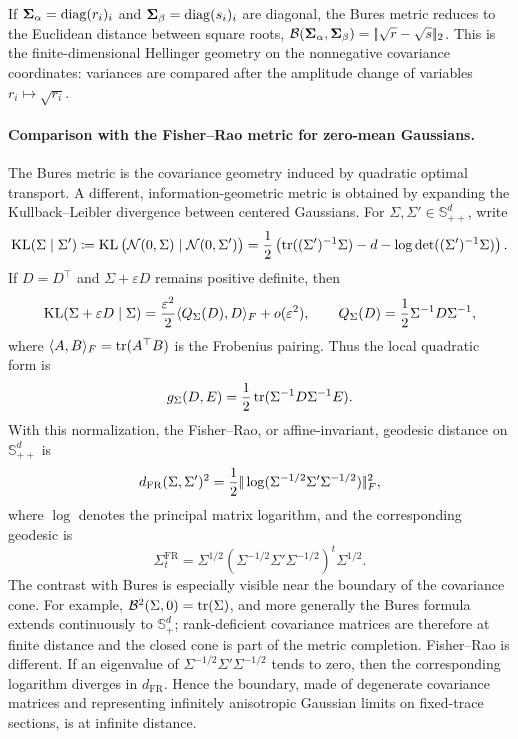 \begin{rem}
	If $\mathbf{\Sigma}_\alpha=\operatorname{diag}(r_i)_i$ and $\mathbf{\Sigma}_\beta=\operatorname{diag}(s_i)_i$ are diagonal, the Bures metric reduces to the Euclidean distance between square roots,
	$\mathcal{B}(\mathbf{\Sigma}_\alpha,\mathbf{\Sigma}_\beta)=|\!| \sqrt r-\sqrt s |\!|_2$.
	This is the finite-dimensional Hellinger geometry on the nonnegative covariance coordinates: variances are compared after the amplitude change of variables $r_i\mapsto\sqrt{r_i}$.
\end{rem}

\paragraph{Comparison with the Fisher--Rao metric for zero-mean Gaussians.}
The Bures metric is the covariance geometry induced by quadratic optimal transport. A different, information-geometric metric is obtained by expanding the Kullback--Leibler divergence between centered Gaussians. For $\Sigma,\Sigma'\in\mathbb S_{++}^d$, write
\[
	\operatorname{KL}(\Sigma\mid\Sigma')
	\coloneqq
	\operatorname{KL}\big(\mathcal{N}(0,\Sigma)\mid\mathcal{N}(0,\Sigma')\big)
	=
	\frac12\left(
	\operatorname{tr}((\Sigma')^{-1}\Sigma)-d-\log\det((\Sigma')^{-1}\Sigma)
	\right).
\]
If $D=D^\top$ and $\Sigma+\varepsilon D$ remains positive definite, then
\[
	\operatorname{KL}(\Sigma+\varepsilon D\mid\Sigma)
	=
	\frac{\varepsilon^2}{2}\langle Q_\Sigma(D),D\rangle_F+o(\varepsilon^2),
	\qquad
	Q_\Sigma(D)=\frac12\Sigma^{-1}D\Sigma^{-1},
\]
where $\langle A,B\rangle_F=\operatorname{tr}(A^\top B)$ is the Frobenius pairing. Thus the local quadratic form is
\[
	g_\Sigma(D,E)=\frac12\operatorname{tr}(\Sigma^{-1}D\Sigma^{-1}E).
\]
With this normalization, the Fisher--Rao, or affine-invariant, geodesic distance on $\mathbb S_{++}^d$ is
\[
	d_{\mathrm{FR}}(\Sigma,\Sigma')^2
	=
	\frac12
	|\!| \log(\Sigma^{-1/2}\Sigma'\Sigma^{-1/2}) |\!|_F^2,
\]
where $\log$ denotes the principal matrix logarithm, and the corresponding geodesic is
\[
	\Sigma_t^{\mathrm{FR}}
	=
	\Sigma^{1/2}
	\left(\Sigma^{-1/2}\Sigma'\Sigma^{-1/2}\right)^t
	\Sigma^{1/2}.
\]
The contrast with Bures is especially visible near the boundary of the covariance cone. For example, $\mathcal{B}^2(\Sigma,0)=\operatorname{tr}(\Sigma)$, and more generally the Bures formula extends continuously to $\mathbb S_+^d$; rank-deficient covariance matrices are therefore at finite distance and the closed cone is part of the metric completion. Fisher--Rao is different. If an eigenvalue of $\Sigma^{-1/2}\Sigma'\Sigma^{-1/2}$ tends to zero, then the corresponding logarithm diverges in $d_{\mathrm{FR}}$. Hence the boundary, made of degenerate covariance matrices and representing infinitely anisotropic Gaussian limits on fixed-trace sections, is at infinite distance.

